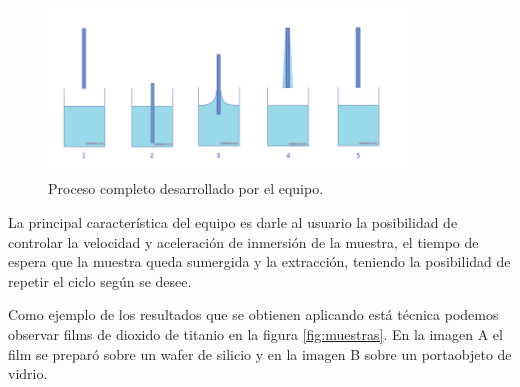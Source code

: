 \begin{figure}[htpb]
\centering 
\includegraphics[width=0.85\textwidth]{./Figures/dip-coating.png}
\caption{Proceso completo desarrollado por el equipo.}
\label{fig:inmersion}
\end{figure}

 
La principal característica del equipo es darle al usuario la posibilidad de controlar la velocidad y aceleración de inmersión de la muestra, el tiempo de espera que la muestra queda sumergida y la extracción, teniendo la posibilidad de repetir el ciclo según se desee.

Como ejemplo de los resultados que se obtienen aplicando está técnica podemos observar films de dioxido de titanio  en la figura \ref{fig:muestras}. En la imagen A el film se preparó sobre un wafer de silicio y en la imagen B sobre un portaobjeto de vidrio.


